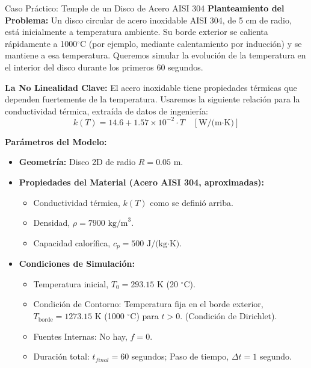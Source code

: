 \begin{examplebox}{Caso Práctico: Temple de un Disco de Acero AISI 304}
    \textbf{Planteamiento del Problema:} Un disco circular de acero inoxidable AISI 304, de 5 cm de radio, está inicialmente a temperatura ambiente. Su borde exterior se calienta rápidamente a 1000$^{\circ}$C (por ejemplo, mediante calentamiento por inducción) y se mantiene a esa temperatura. Queremos simular la evolución de la temperatura en el interior del disco durante los primeros 60 segundos.
    
    \textbf{La No Linealidad Clave:} El acero inoxidable tiene propiedades térmicas que dependen fuertemente de la temperatura. Usaremos la siguiente relación para la conductividad térmica, extraída de datos de ingeniería:
    $$ k(T) = 14.6 + 1.57 \times 10^{-2} \cdot T \quad [\text{W/(m·K)}] $$
    
    \textbf{Parámetros del Modelo:}
    \begin{itemize}
        \item \textbf{Geometría:} Disco 2D de radio $R=0.05$ m.
        \item \textbf{Propiedades del Material (Acero AISI 304, aproximadas):}
            \begin{itemize}
                \item Conductividad térmica, $k(T)$ como se definió arriba.
                \item Densidad, $\rho = 7900 \text{ kg/m}^3$.
                \item Capacidad calorífica, $c_p = 500 \text{ J/(kg·K)}$.
            \end{itemize}
        \item \textbf{Condiciones de Simulación:}
            \begin{itemize}
                \item Temperatura inicial, $T_0 = 293.15 \text{ K}$ (20 $^{\circ}$C).
                \item Condición de Contorno: Temperatura fija en el borde exterior, $T_{\text{borde}} = 1273.15 \text{ K}$ (1000 $^{\circ}$C) para $t>0$. (Condición de Dirichlet).
                \item Fuentes Internas: No hay, $f=0$.
                \item Duración total: $t_{final} = 60$ segundos; Paso de tiempo, $\Delta t = 1$ segundo.
            \end{itemize}
    \end{itemize} %
\end{examplebox}

